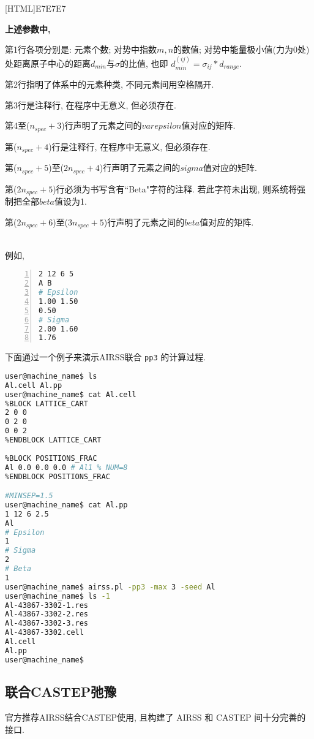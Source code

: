 \documentclass[a4paper, 10pt]{article}
\begin{document}
\noindent{}[HTML]{E7E7E7}{\parbox{\textwidth}{%
\noindent \textbf{上述参数中, }
\begin{maineu}
  \item 第1行各项分别是: 元素个数; 对势中指数\(m,n\)的数值; 对势中能量极小值(力为0处)处距离原子中心的距离\(d_{min}\)与\(\sigma\)的比值, 也即 \(d_{min}^{(ij)} = \sigma_{ij}*d_{range}\). 
  \item 第2行指明了体系中的元素种类, 不同元素间用空格隔开. 
  \item 第3行是注释行, 在程序中无意义, 但必须存在. 
  \item 第4至(\(n_{spec}+3\))行声明了元素之间的\(varepsilon\)值对应的矩阵.
  \item 第(\(n_{spec}+4\))行是注释行, 在程序中无意义, 但必须存在. 
  \item 第(\(n_{spec}+5\))至(\(2n_{spec}+4\))行声明了元素之间的\(sigma\)值对应的矩阵.
  \item 第(\(2n_{spec}+5\))行必须为书写含有``Beta"字符的注释. 若此字符未出现, 则系统将强制把全部\(beta\)值设为1.
  \item 第(\(2n_{spec}+6\))至(\(3n_{spec}+5\))行声明了元素之间的\(beta\)值对应的矩阵.
\end{maineu}}}\\

例如,
\begin{lstlisting}[language={bash},numbers=left]
2 12 6 5
A B
# Epsilon
1.00 1.50
0.50
# Sigma
2.00 1.60
1.76
\end{lstlisting}

下面通过一个例子来演示AIRSS联合 \verb|pp3| 的计算过程.
\begin{lstlisting}[language={bash}]
user@machine_name$ ls 
Al.cell Al.pp
user@machine_name$ cat Al.cell
%BLOCK LATTICE_CART
2 0 0
0 2 0
0 0 2 
%ENDBLOCK LATTICE_CART
 
%BLOCK POSITIONS_FRAC
Al 0.0 0.0 0.0 # Al1 % NUM=8
%ENDBLOCK POSITIONS_FRAC

#MINSEP=1.5
user@machine_name$ cat Al.pp
1 12 6 2.5
Al
# Epsilon
1
# Sigma
2
# Beta
1
user@machine_name$ airss.pl -pp3 -max 3 -seed Al
user@machine_name$ ls -1
Al-43867-3302-1.res
Al-43867-3302-2.res
Al-43867-3302-3.res
Al-43867-3302.cell
Al.cell
Al.pp
user@machine_name$
\end{lstlisting}

\subsection{联合CASTEP弛豫}
官方推荐AIRSS结合CASTEP使用, 且构建了 AIRSS 和 CASTEP 间十分完善的接口. 
\end{document}
